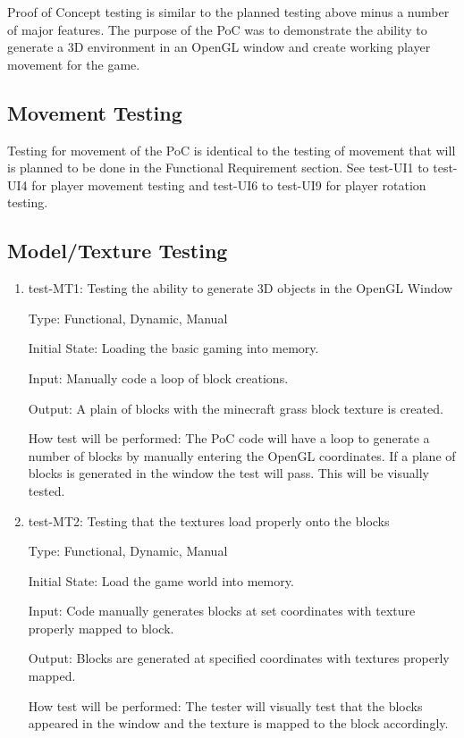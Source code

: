 \documentclass[12pt, titlepage]{article}
\begin{document}
Proof of Concept testing is similar to the planned testing above minus a number of major features. The purpose of the PoC was to demonstrate the ability to generate a 3D environment in an OpenGL window and create working player movement for the game.

\subsection{Movement Testing}
		
Testing for movement of the PoC is identical to the testing of movement that will is planned to be done in the Functional Requirement section. See test-UI1 to test-UI4 for player movement testing and test-UI6 to test-UI9 for player rotation testing.

\subsection{Model/Texture Testing}

\begin{enumerate}

\item{test-MT1: Testing the ability to generate 3D objects in the OpenGL Window\\}

Type: Functional, Dynamic, Manual
					
Initial State: Loading the basic gaming into memory.
					
Input: Manually code a loop of block creations.
					
Output: A plain of blocks with the minecraft grass block texture is created.
					
How test will be performed: The PoC code will have a loop to generate a number of blocks by manually entering the OpenGL coordinates. If a plane of blocks is generated in the window the test will pass. This will be visually tested.
					
\item{test-MT2: Testing that the textures load properly onto the blocks\\}

Type: Functional, Dynamic, Manual
					
Initial State: Load the game world into memory. 
					
Input: Code manually generates blocks at set coordinates with texture properly mapped to block.
					
Output: Blocks are generated at specified coordinates with textures properly mapped.
					
How test will be performed: The tester will visually test that the blocks appeared in the window and the texture is mapped to the block accordingly.

\end{enumerate}
\end{document}
